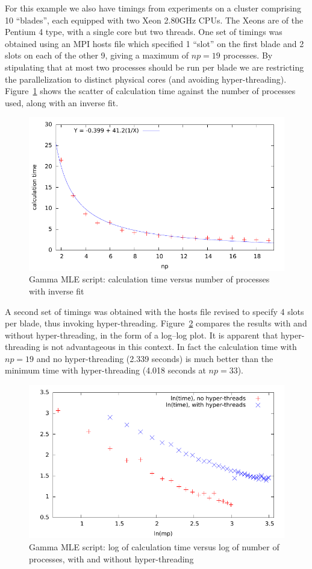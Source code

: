 \documentclass{article}
\begin{document}
For this example we also have timings from experiments on a cluster
comprising 10 ``blades'', each equipped with two Xeon 2.80GHz
CPUs. The Xeons are of the Pentium 4 type, with a single core but two
threads. One set of timings was obtained using an MPI hosts file which
specified 1 ``slot'' on the first blade and 2 slots on each of the
other 9, giving a maximum of $np=19$ processes. By stipulating that at
most two processes should be run per blade we are restricting the
parallelization to distinct physical cores (and avoiding
hyper-threading). Figure~\ref{fig:gamma-inverse} shows the scatter of
calculation time against the number of processes used, along with an
inverse fit.

\begin{figure}[htbp]
  \centering
  \includegraphics[scale=0.8]{figures/gamma-inverse}
  \caption{Gamma MLE script: calculation time versus number of
    processes with inverse fit}
  \label{fig:gamma-inverse}
\end{figure}

A second set of timings was obtained with the hosts file revised to
specify 4 slots per blade, thus invoking
hyper-threading. Figure~\ref{fig:gamma-log} compares the results with
and without hyper-threading, in the form of a log--log plot. It is
apparent that hyper-threading is not advantageous in this context.  In
fact the calculation time with $np=19$ and no hyper-threading (2.339
seconds) is much better than the minimum time with hyper-threading
(4.018 seconds at $np=33$).

\begin{figure}[htbp]
  \centering
  \includegraphics[scale=0.8]{figures/gamma-log}
  \caption{Gamma MLE script: log of calculation time versus log of
    number of processes, with and without hyper-threading}
  \label{fig:gamma-log}
\end{figure}
\end{document}
